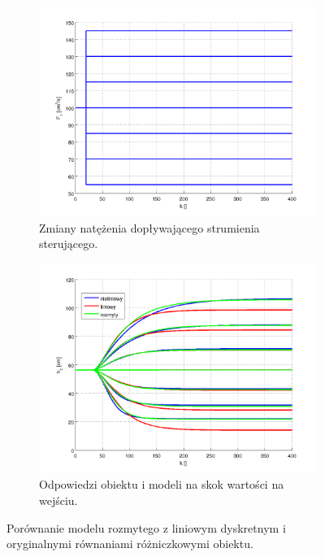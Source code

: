 \documentclass[a4paper,12pt]{article}
\begin{document}
\begin{figure}[h]
   \centering
   \begin{subfigure}[h]{0.45\textwidth}
      \includegraphics[width=\textwidth]{img/modele_1a.png}
      \caption{Zmiany natężenia dopływającego strumienia sterującego.}
   \end{subfigure}
   \begin{subfigure}[h]{0.45\textwidth}
      \includegraphics[width=\textwidth]{img/modele_1b.png}
      \caption{Odpowiedzi obiektu i modeli na skok wartości na wejściu.}
   \end{subfigure}
   \caption{Porównanie modelu rozmytego z liniowym dyskretnym i oryginalnymi równaniami różniczkowymi obiektu.}
   \label{img:modele_1}
\end{figure}
\end{document}
